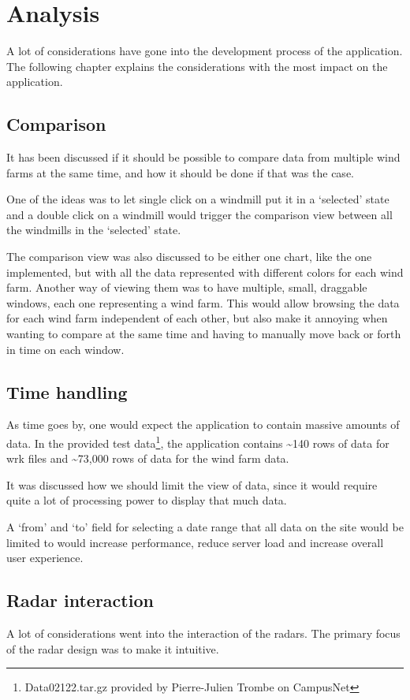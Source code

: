 \chapter{Analysis}
\label{sec:analysis}
A lot of considerations have gone into the development process of the application. The following chapter explains the considerations with the most impact on the application.

\section{Comparison}
\label{sec:comparison}
It has been discussed if it should be possible to compare data from multiple wind farms at the same time, and how it should be done if that was the case.

One of the ideas was to let single click on a windmill put it in a `selected' state and a double click on a windmill would trigger the comparison view between all the windmills in the `selected' state.

The comparison view was also discussed to be either one chart, like the one implemented, but with all the data represented with different colors for each wind farm.
Another way of viewing them was to have multiple, small, draggable windows, each one representing a wind farm. This would allow browsing the data for each wind farm independent of each other, but also make it annoying when wanting to compare at the same time and having to manually move back or forth in time on each window.

\section{Time handling}
\label{sec:time_handling}
As time goes by, one would expect the application to contain massive amounts of data.
In the provided test data\footnote{Data02122.tar.gz provided by Pierre-Julien Trombe on CampusNet}, the application contains \textasciitilde 140 rows of data for \textsf{wrk} files and \textasciitilde 73,000 rows of data for the wind farm data.

It was discussed how we should limit the view of data, since it would require quite a lot of processing power to display that much data.

A `from' and `to' field for selecting a date range that all data on the site would be limited to would increase performance, reduce server load and increase overall user experience.

\section{Radar interaction}
\label{sec:radar_interaction}
A lot of considerations went into the interaction of the radars. The primary focus of the radar design was to make it intuitive.

